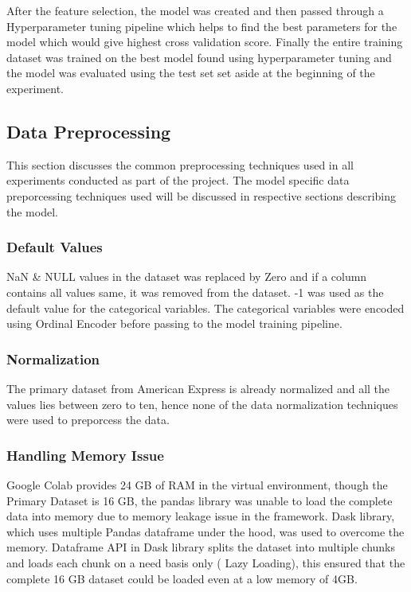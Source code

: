 \documentclass[twoside,11pt,a4paper]{article}
\begin{document}
\FloatBarrier
After the feature selection, the model was created and then passed through a Hyperparameter tuning pipeline which helps to find the best parameters for the model which would give highest cross validation score. Finally the entire training dataset was trained on the best model found using hyperparameter tuning and the model was evaluated using the test set set aside at the beginning of the experiment.

\subsection{Data Preprocessing} 
This section discusses the common preprocessing techniques used in all experiments conducted as part of the project. The model specific data preporcessing techniques used will be discussed in respective sections describing the model.

\subsubsection{Default Values}
NaN \& NULL values in the dataset was replaced by Zero and if a column contains all values same, it was removed from the dataset. -1 was used as the default value for the categorical variables. The categorical variables were encoded using Ordinal Encoder before passing to the model training pipeline.

\subsubsection{Normalization}
The primary dataset from American Express is already normalized and all the values lies between zero to ten, hence none of the data normalization techniques were used to preporcess the data.
\subsubsection{Handling Memory Issue}
Google Colab provides 24 GB of \acf{RAM} in the  virtual environment, though the Primary Dataset is 16 GB,  the pandas library was unable to load the complete data into memory due to memory leakage issue in the framework. Dask library, which uses multiple Pandas dataframe under the hood, was used to overcome the memory. Dataframe API in Dask library splits the dataset into multiple chunks and loads each chunk on a need basis only ( Lazy Loading), this ensured that the complete 16 GB dataset could be loaded even at a low memory of 4GB.
\end{document}
